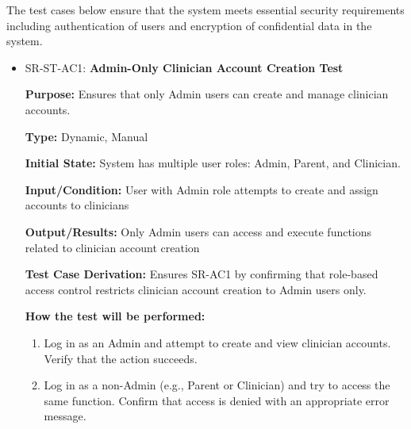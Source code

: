 \documentclass[12pt, titlepage]{article}
\begin{document}
The test cases below ensure that the system meets essential 
security requirements including authentication of users and encryption of 
confidential data in the system.
		
\begin{itemize}

  \item SR-ST-AC1: \textbf{Admin-Only Clinician Account Creation Test}
  \begin{mdframed}[linewidth=0.5mm]
      \textbf{Purpose:} Ensures that only Admin users can create and manage clinician accounts. \par
      \textbf{Type:} Dynamic, Manual \par
      \textbf{Initial State:} System has multiple user roles: Admin, Parent, and Clinician. \par
      \textbf{Input/Condition:} User with Admin role attempts to create and assign accounts to clinicians \par
      \textbf{Output/Results:} Only Admin users can access and execute functions related 
      to clinician account creation \par
      \textbf{Test Case Derivation:} Ensures SR-AC1 by confirming that role-based access control restricts clinician account creation to Admin users only. \par
      \textbf{How the test will be performed:}
      \begin{enumerate}[noitemsep]
        \item Log in as an Admin and attempt to create and view clinician accounts. Verify that the action succeeds.
        \item Log in as a non-Admin (e.g., Parent or Clinician) and try to access the same function. Confirm that access is denied with an appropriate error message.
      \end{enumerate}
  \end{mdframed}


\end{itemize}
\end{document}
